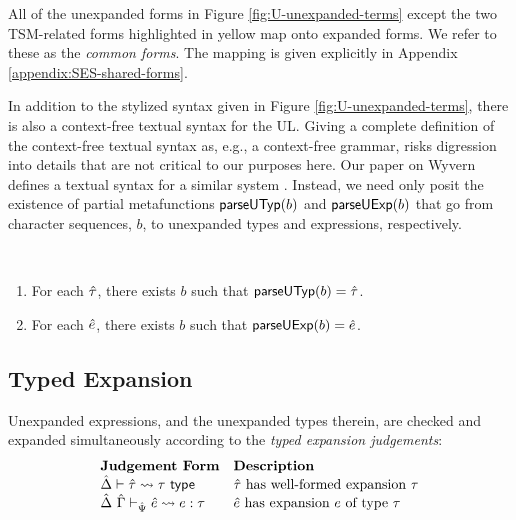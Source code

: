 All of the unexpanded forms in Figure \ref{fig:U-unexpanded-terms} except the two TSM-related forms highlighted in yellow map onto expanded forms. We refer to these as the \emph{common forms}. The mapping is given explicitly in Appendix \ref{appendix:SES-shared-forms}.



In addition to the stylized syntax given in Figure \ref{fig:U-unexpanded-terms}, there is also a context-free textual syntax for the UL. 
Giving a complete definition of the context-free textual syntax as, e.g., a context-free grammar, risks digression into details that are not critical to our purposes here. Our paper on Wyvern defines a textual syntax for a similar system \cite{TSLs}. Instead, we need only posit the existence of partial metafunctions $\mathsf{parseUTyp}(b)$ and $\mathsf{parseUExp}(b)$  that go from character sequences, $b$, to unexpanded types and expressions, respectively. 
\begingroup
\def\thetheorem{\ref{condition:textual-representability-SES}}
\begin{condition} ~
\begin{enumerate}
\item For each ${\hat\tau}$, there exists $b$ such that $\mathsf{parseUTyp}(b)={\hat\tau}$. 
\item For each ${\hat e}$, there exists $b$ such that $\mathsf{parseUExp}(b)={\hat e}$.
\end{enumerate}
\end{condition}
\endgroup

\subsection{Typed Expansion}\label{sec:typed-expansion-U}
Unexpanded expressions, and the unexpanded types therein, are checked and expanded simultaneously according to the \emph{typed expansion judgements}:
\[\begin{array}{ll}
\textbf{Judgement Form} & \textbf{Description}\\
\hat{\Delta} \vdash {\hat\tau} \leadsto \tau~\mathsf{type} & \text{${\hat\tau}$ has well-formed expansion $\tau$}\\
\hat{\Delta}~\hat{\Gamma} \vdash_{\hat{\Psi}} {\hat e} \leadsto e : \tau & \text{${\hat e}$ has expansion $e$ of type $\tau$}\end{array}\]

